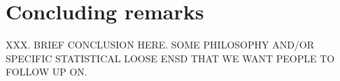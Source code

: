 \documentclass[12pt]{article}
\theoremstyle{plain}
\begin{document}
\section{Concluding remarks}
\label{sxn:conc}

XXX.  BRIEF CONCLUSION HERE.  SOME PHILOSOPHY AND/OR SPECIFIC STATISTICAL LOOSE ENSD THAT WE WANT PEOPLE TO FOLLOW UP ON.




%

\end{document}
